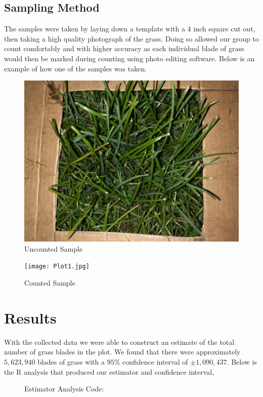 \documentclass[12pt]{amsart}
\begin{document}
\subsection{Sampling Method}
The samples were taken by laying down a template with a 4 inch square cut out, then taking a high quality photograph of the grass. Doing so 
allowed our group to count comfortably and with higher accuracy as each individual blade of grass would then be marked during counting using 
photo editing software. Below is an example of how one of the samples was taken.
\begin{figure}[H]
    \begin{center}
    \caption{Uncounted Sample}
    \includegraphics[width=.66\linewidth]{Plot11.JPG}
    \end{center}
\end{figure}
\begin{figure}[H]
    \begin{center}
    \caption{Counted Sample}
    \texttt{[image: Plot1.jpg]}
    \end{center}
\end{figure}


\section{Results}
With the collected data we were able to construct an estimate of the total number of grass blades in the plot. We found that 
there were approximately $5,623,940$ blades of grass with a $95\%$ confidence interval of $\pm 1,090,437$. Below is the R analysis 
that produced our estimator and confidence interval, 
\begin{figure}[H]
    \begin{center}
        \caption{Estimator Analysis Code:}
        
        \end{center} 
    \end{figure}
\end{document}
